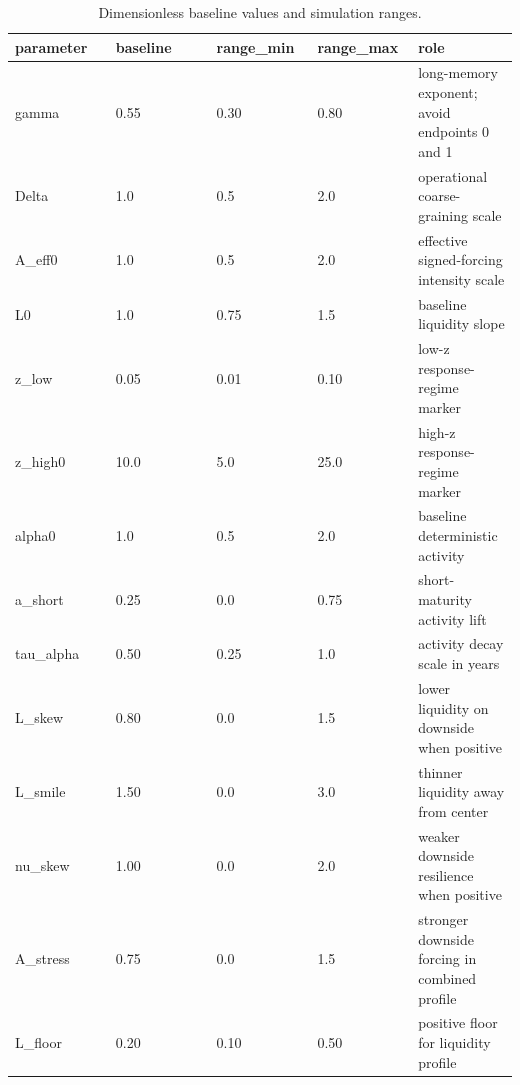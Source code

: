 \documentclass{article}
\begin{document}
\begin{table}[ht]
\centering
\caption{Dimensionless baseline values and simulation ranges.}
\label{tab:parameter-ranges-v1}
\begin{tabular}{p{0.20\linewidth}p{0.20\linewidth}p{0.20\linewidth}p{0.20\linewidth}p{0.20\linewidth}}
\toprule
parameter & baseline & range\_min & range\_max & role \\
\midrule
gamma & 0.55 & 0.30 & 0.80 & long-memory exponent; avoid endpoints 0 and 1 \\
Delta & 1.0 & 0.5 & 2.0 & operational coarse-graining scale \\
A\_eff0 & 1.0 & 0.5 & 2.0 & effective signed-forcing intensity scale \\
L0 & 1.0 & 0.75 & 1.5 & baseline liquidity slope \\
z\_low & 0.05 & 0.01 & 0.10 & low-z response-regime marker \\
z\_high0 & 10.0 & 5.0 & 25.0 & high-z response-regime marker \\
alpha0 & 1.0 & 0.5 & 2.0 & baseline deterministic activity \\
a\_short & 0.25 & 0.0 & 0.75 & short-maturity activity lift \\
tau\_alpha & 0.50 & 0.25 & 1.0 & activity decay scale in years \\
L\_skew & 0.80 & 0.0 & 1.5 & lower liquidity on downside when positive \\
L\_smile & 1.50 & 0.0 & 3.0 & thinner liquidity away from center \\
nu\_skew & 1.00 & 0.0 & 2.0 & weaker downside resilience when positive \\
A\_stress & 0.75 & 0.0 & 1.5 & stronger downside forcing in combined profile \\
L\_floor & 0.20 & 0.10 & 0.50 & positive floor for liquidity profile \\
\bottomrule
\end{tabular}
\end{table}
\end{document}
